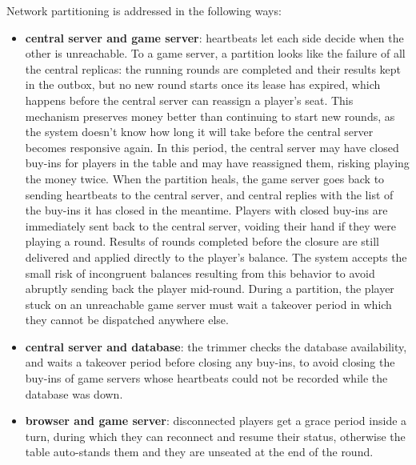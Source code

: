 \documentclass{scrartcl}
\begin{document}
Network partitioning is addressed in the following ways:
\begin{itemize}
  \item \textbf{central server and game server}: heartbeats let each side decide when the other is unreachable.
  To a game server, a partition looks like the failure of all the central replicas: the running rounds are completed and their results kept in the outbox,
  but no new round starts once its lease has expired, which happens before the central server can reassign a player's seat.
  This mechanism preserves money better than continuing to start new rounds, as the system doesn't know how long it will take before the central server becomes responsive again. In this period, the central server may have closed buy-ins for players in the table and may have reassigned them, risking playing the money twice.
  When the partition heals, the game server goes back to sending heartbeats to the central server, and central replies with the list of the buy-ins it has closed in the meantime. Players with closed buy-ins are immediately sent back to the central server, voiding their hand if they were playing a round. Results of rounds completed before the closure are still delivered and applied directly to the player's balance.
  The system accepts the small risk of incongruent balances resulting from this behavior to avoid abruptly sending back the player mid-round.
  During a partition, the player stuck on an unreachable game server must wait a takeover period in which they cannot be dispatched anywhere else.
  \item \textbf{central server and database}: the trimmer checks the database availability, and waits a takeover period before closing any buy-ins, to avoid closing the buy-ins of game servers whose heartbeats could not be recorded while the database was down.
  \item \textbf{browser and game server}: disconnected players get a grace period inside a turn, during which they can reconnect and resume their status, otherwise the table auto-stands them and they are unseated at the end of the round.
\end{itemize}

  
\end{document}
